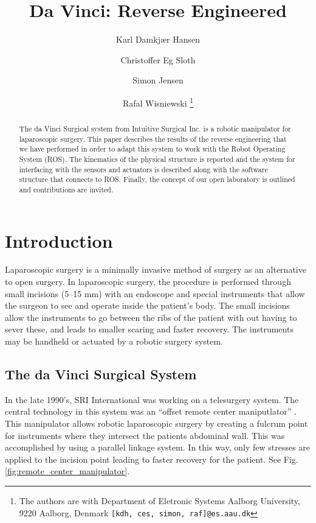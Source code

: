 \documentclass[a4paper, 10 pt, conference]{ieeeconf}      %
\title{\LARGE \bf
Da Vinci: Reverse Engineered
}
\author{Karl Damkjær Hansen \and Christoffer Eg Sloth \and Simon Jensen \and Rafal Wisniewski%
\thanks{The authors are with Department of Eletronic Systems
        Aalborg University, 9220 Aalborg, Denmark
        {\tt\small [kdh, ces, simon, raf]@es.aau.dk}}%
}
\begin{document}
\maketitle
\thispagestyle{empty}
\pagestyle{empty}


\begin{abstract}

The da Vinci Surgical system from Intuitive Surgical Inc. is a robotic manipulator for laparoscopic surgery. This paper describes the results of the reverse engineering that we have performed in order to adapt this system to work with the Robot Operating System (ROS). The kinematics of the physical structure is reported and the system for interfacing with the sensors and actuators is described along with the software structure that connects to ROS. Finally, the concept of our open laboratory is outlined and contributions are invited.

\end{abstract}


\section{Introduction}
Laparoscopic surgery is a minimally invasive method of surgery as an alternative to open surgery.
In laparoscopic surgery, the procedure is performed through small incisions (5--15 mm) with an endoscope and special instruments that allow the surgeon to see and operate inside the patient's body.
The small incisions allow the instruments to go between the ribs of the patient with out having to sever these, and leads to smaller scaring and faster recovery. 
The instruments may be handheld or actuated by a robotic surgery system.

\subsection{The da Vinci Surgical System}
In the late 1990's, SRI International was working on a telesurgery system.
The central technology in this system was an ``offset remote center maniputlator'' \cite{jensen1998remote}.
This manipulator allows robotic laparoscopic surgery by creating a fulcrum point for instruments where they intersect the patients abdominal wall.
This was accomplished by using a parallel linkage system.
In this way, only few stresses are applied to the incision point leading to faster recovery for the patient.
See Fig. \ref{fig:remote_center_manipulator}.
\end{document}

